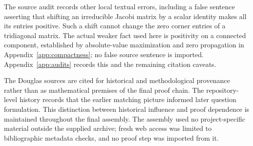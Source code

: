 The source audit records other local textual errors, including a false
sentence asserting that shifting an irreducible Jacobi matrix by a scalar
identity makes all its entries positive. Such a shift cannot change the
zero corner entries of a tridiagonal matrix. The actual weaker fact used
here is positivity on a connected component, established by absolute-value
maximization and zero propagation in Appendix~\ref{app:compactness}; no
false source sentence is imported. Appendix~\ref{app:audits} records this
and the remaining citation caveats.

The Douglas sources are cited for historical and methodological provenance
rather than as mathematical premises of the final proof chain. The
repository-level history records that the earlier matching picture informed
later question formulation. This distinction between historical influence
and proof dependence is maintained throughout the final assembly. The
assembly used no project-specific material outside the supplied archive;
fresh web access was limited to bibliographic metadata checks, and no proof
step was imported from it.
